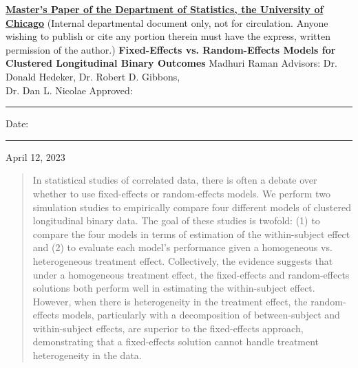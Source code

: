 \documentclass{article}
\begin{document}
\begin{titlepage}
    \begin{center}
        \vspace{0cm}
        \hspace{0cm}
        \textbf{\underline{Master’s Paper of the Department of Statistics, the University of Chicago}}
        \vspace{0.25cm}
        (Internal departmental document only, not for circulation. Anyone wishing to publish or cite any portion therein must have the express, written permission of the author.)
        \vspace{3cm}
        \Huge{\textbf{Fixed-Effects vs. Random-Effects Models for Clustered Longitudinal Binary Outcomes}}
        \vspace{3cm}
        \huge{Madhuri Raman}
        \vspace{3cm}
        \LARGE{Advisors: Dr. Donald Hedeker, Dr. Robert D. Gibbons, \\ Dr. Dan L. Nicolae}
        \vspace{2cm}
        \LARGE{Approved:}  
        \rule{9cm}{0.15mm} 
        \vspace{0.1cm}
        \newline
        \vspace{0.1cm}
        \LARGE{Date:}
        \rule{10cm}{0.15mm}
        \vspace{1cm}
        \LARGE{April 12, 2023}
        \end{center}
\end{titlepage}

\begin{abstract}
    In statistical studies of correlated data, there is often a debate over whether to use fixed-effects or random-effects models. We perform two simulation studies to empirically compare four different models of clustered longitudinal binary data. The goal of these studies is twofold: (1) to compare the four models in terms of estimation of the within-subject effect and (2) to evaluate each model's performance given a homogeneous vs. heterogeneous treatment effect. Collectively, the evidence suggests that under a homogeneous treatment effect, the fixed-effects and random-effects solutions both perform well in estimating the within-subject effect. However, when there is heterogeneity in the treatment effect, the random-effects models, particularly with a decomposition of between-subject and within-subject effects, are superior to the fixed-effects approach, demonstrating that a fixed-effects solution cannot handle treatment heterogeneity in the data.  
\end{abstract}
\end{document}
